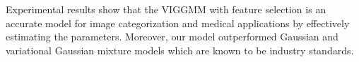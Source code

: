 \documentclass[letterpaper]{article}
\begin{document}
Experimental results show that the VIGGMM with feature selection is an accurate model for image categorization and medical applications by effectively estimating the parameters.
Moreover, our model outperformed Gaussian and variational Gaussian mixture models which are known to be industry standards.  














\end{document}
